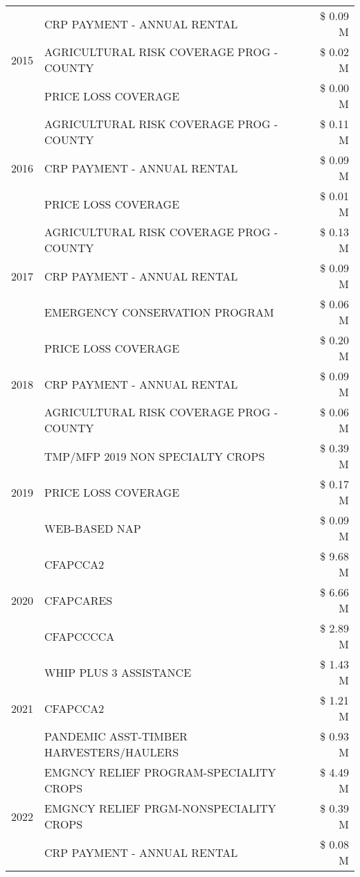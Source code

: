 \begin{tabular}{llr}
\cline{1-3}
\multirow[t]{3}{*}{2015} & CRP PAYMENT - ANNUAL RENTAL & \$ 0.09 M \\
 & AGRICULTURAL RISK COVERAGE PROG - COUNTY & \$ 0.02 M \\
 & PRICE LOSS COVERAGE & \$ 0.00 M \\
\cline{1-3}
\multirow[t]{3}{*}{2016} & AGRICULTURAL RISK COVERAGE PROG - COUNTY & \$ 0.11 M \\
 & CRP PAYMENT - ANNUAL RENTAL & \$ 0.09 M \\
 & PRICE LOSS COVERAGE & \$ 0.01 M \\
\cline{1-3}
\multirow[t]{3}{*}{2017} & AGRICULTURAL RISK COVERAGE PROG - COUNTY & \$ 0.13 M \\
 & CRP PAYMENT - ANNUAL RENTAL & \$ 0.09 M \\
 & EMERGENCY CONSERVATION PROGRAM & \$ 0.06 M \\
\cline{1-3}
\multirow[t]{3}{*}{2018} & PRICE LOSS COVERAGE & \$ 0.20 M \\
 & CRP PAYMENT - ANNUAL RENTAL & \$ 0.09 M \\
 & AGRICULTURAL RISK COVERAGE PROG - COUNTY & \$ 0.06 M \\
\cline{1-3}
\multirow[t]{3}{*}{2019} & TMP/MFP 2019 NON SPECIALTY CROPS & \$ 0.39 M \\
 & PRICE LOSS COVERAGE & \$ 0.17 M \\
 & WEB-BASED NAP & \$ 0.09 M \\
\cline{1-3}
\multirow[t]{3}{*}{2020} & CFAPCCA2 & \$ 9.68 M \\
 & CFAPCARES & \$ 6.66 M \\
 & CFAPCCCCA & \$ 2.89 M \\
\cline{1-3}
\multirow[t]{3}{*}{2021} & WHIP PLUS 3 ASSISTANCE & \$ 1.43 M \\
 & CFAPCCA2 & \$ 1.21 M \\
 & PANDEMIC ASST-TIMBER HARVESTERS/HAULERS & \$ 0.93 M \\
\cline{1-3}
\multirow[t]{3}{*}{2022} & EMGNCY RELIEF PROGRAM-SPECIALITY CROPS & \$ 4.49 M \\
 & EMGNCY RELIEF PRGM-NONSPECIALITY CROPS & \$ 0.39 M \\
 & CRP PAYMENT - ANNUAL RENTAL & \$ 0.08 M \\
\cline{1-3}
\bottomrule
\end{tabular}
